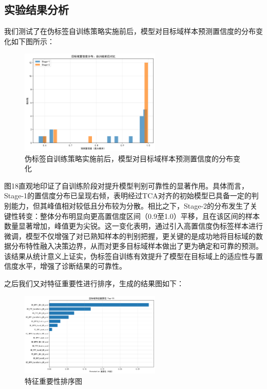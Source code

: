 \documentclass[a4paper]{CPIPC}
\numberwithin{equation}{section}
\begin{document}
\subsection{实验结果分析}

我们测试了在伪标签自训练策略实施前后，模型对目标域样本预测置信度的分布变化如下图所示：

\begin{figure}[H]
  \centering
  \includegraphics[width=0.6\textwidth]{伪标签自训练策略实施前后，模型对目标域样本预测置信度的分布变化.png}
  \caption{伪标签自训练策略实施前后，模型对目标域样本预测置信度的分布变化}
  \label{fig:confidence}
\end{figure}

图18直观地印证了自训练阶段对提升模型判别可靠性的显著作用。具体而言，Stage-1的置信度分布已呈现右倾，表明经过TCA对齐的初始模型已具备一定的判别能力，但其峰值相对较低且分布较为分散。相比之下，Stage-2的分布发生了关键性转变：整体分布明显向更高置信度区间（0.9至1.0）平移，且在该区间的样本数量显著增加，峰值更为尖锐。这一变化表明，通过引入高置信度伪标签样本进行微调，模型不仅增强了对已熟知样本的判别把握，更关键的是成功地将目标域的数据分布特性融入决策边界，从而对更多目标域样本做出了更为确定和可靠的预测。该结果从统计意义上证实，伪标签自训练有效提升了模型在目标域上的适应性与置信度水平，增强了诊断结果的可靠性\cite{ref10}。


之后我们又对特征重要性进行排序，生成的结果图如下：
\begin{figure}[H]
  \centering
  \includegraphics[width=0.6\textwidth]{特征重要性排序图.png}
  \caption{特征重要性排序图}
  \label{fig:confidence}
\end{figure}
\end{document}

